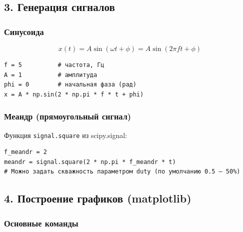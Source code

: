 \documentclass[12pt,a4paper,openany]{book}
\begin{document}
\subsection*{3. Генерация сигналов}

\subsubsection*{Синусоида}

\[
x(t) = A \sin(\omega t + \phi) = A \sin(2\pi f t + \phi)
\]

\begin{Verbatim}[fontsize=\small, breaklines, breakanywhere]
f = 5          # частота, Гц
A = 1          # амплитуда
phi = 0        # начальная фаза (рад)
x = A * np.sin(2 * np.pi * f * t + phi)
\end{Verbatim}

\subsubsection*{Меандр (прямоугольный сигнал)}

Функция \texttt{signal.\allowbreak{}square} из scipy.signal:

\begin{Verbatim}[fontsize=\small, breaklines, breakanywhere]
f_meandr = 2
meandr = signal.square(2 * np.pi * f_meandr * t)
# Можно задать скважность параметром duty (по умолчанию 0.5 – 50%)
\end{Verbatim}

\subsection*{4. Построение графиков (matplotlib)}

\subsubsection*{Основные команды}
\end{document}
